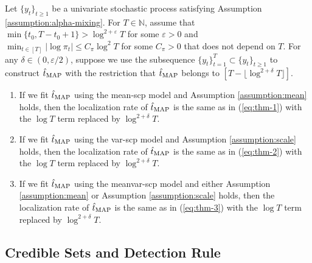 \begin{theorem}\label{theorem:alpha-mixing}
    Let $\{y_t\}_{t \geq 1}$ be a univariate stochastic process satisfying Assumption \ref{assumption:alpha-mixing}. For $T \in \mathbb{N}$, assume that $\min\{t_0, T-t_0+1\} > \log^{2+\varepsilon} T$ for some $\varepsilon > 0$ and $\min_{t\in[T]} |\log \pi_{t}| \leq C_\pi \log^2 T$ for some $C_\pi > 0$ that does not depend on $T$.  For any $\delta \in (0,\varepsilon/2)$, suppose we use the subsequence $\{y_t\}_{t = 1}^T \subset \{y_t\}_{t \geq 1}$ to construct $\hat{t}_{\normalfont \text{MAP}}$ with the restriction that $\hat{t}_{\normalfont \text{MAP}}$ belongs to $[T - \lfloor \log^{2+\delta} T\rfloor]$.
    \vspace{-10pt}
    \begin{enumerate}[label=(\roman*)]
        \item If we fit $\hat{t}_{\normalfont \text{MAP}}$ using the mean-scp model and Assumption \ref{assumption:mean} holds, then the localization rate of $\hat{t}_{\normalfont \text{MAP}}$ is the same as in (\ref{eq:thm-1}) with the $\log T$ term replaced by $\log^{2+\delta} T$.
        \item If we fit $\hat{t}_{\normalfont \text{MAP}}$ using  the var-scp model and Assumption \ref{assumption:scale} holds, then the localization rate of $\hat{t}_{\normalfont \text{MAP}}$ is the same as in (\ref{eq:thm-2}) with the $\log T$ term replaced by $\log^{2+\delta} T$.
        \item If we fit $\hat{t}_{\normalfont \text{MAP}}$ using the meanvar-scp model and either Assumption \ref{assumption:mean} or Assumption \ref{assumption:scale} holds, then the localization rate of $\hat{t}_{\normalfont \text{MAP}}$ is the same as in (\ref{eq:thm-3}) with the $\log T$ term replaced by $\log^{2+\delta} T$.
    \end{enumerate}
\end{theorem}

\subsection{Credible Sets and Detection Rule}
\label{sec:cred-sets}

